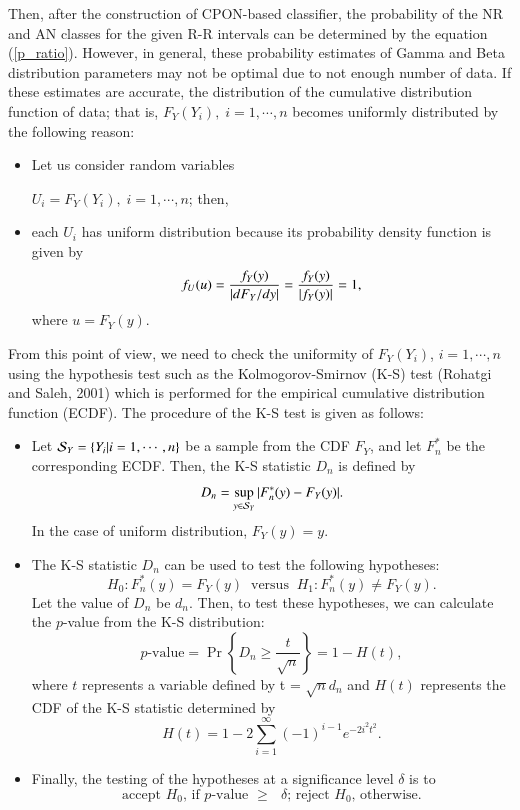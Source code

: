 \documentclass[times,twocolumn,final,authoryear]{elsarticle}
\begin{document}
Then, after the construction of CPON-based classifier, the probability of the NR and AN classes for the given R-R intervals
can be determined by the equation (\ref{p_ratio}).
However, in general, these probability estimates of Gamma and Beta distribution parameters may not be optimal
due to not enough number of data.  If these estimates are accurate, the distribution of the cumulative
distribution function of data; that is, $F_Y(Y_i), \; i=1, \cdots,
n$ becomes uniformly distributed by the following reason:
\begin{itemize}
\item Let us consider random variables 

$U_i=F_Y(Y_i), \; i=1, \cdots, n$; then,
\item each $U_i$ has uniform distribution because its probability
density function is given by
\[
f_U(u)={{f_Y(y)}\over{|{{dF_Y}/{dy}}|}}={{f_Y(y)}\over{|f_Y(y)|}}=1,
\]
where $u=F_Y(y)$.
\end{itemize}
From this point of view, we need to check the uniformity of
$F_Y(Y_i)$, $i=1, \cdots, n$ using the hypothesis test such as the
Kolmogorov-Smirnov (K-S) test (Rohatgi and Saleh, 2001) which is performed for the
empirical cumulative distribution function (ECDF). The procedure of
the K-S test is given as follows:
\begin{itemize}
\item Let ${\cal S}_Y=\{Y_i | i=1, \cdots, n\}$ be a sample from the CDF
$F_Y$, and let $F_n^*$ be the corresponding ECDF. Then, the K-S
statistic $D_n$ is defined by
\begin{equation}
D_n = \sup_{y\in {\cal S}_Y}|F_n^*(y) - F_Y(y)|. \label{D_n}
\end{equation}
In the case of uniform distribution, $F_Y(y) = y$.
\item The K-S statistic $D_n$ can be used to test the following
hypotheses:
\[
H_0: F_n^*(y)=F_Y(y) \; \; \mbox{versus} \; \; H_1: F_n^*(y)\neq
F_Y(y).
\]
Let the value of $D_n$ be $d_n$.  Then, to test these hypotheses, we
can calculate the $p$-value from the K-S distribution:
\begin{equation}
p \textrm{-value} = \Pr\left\{ D_n \geq \frac{t}{\sqrt{n}}\right\} =
1-H(t), \label{p_val}
\end{equation}
where $t$ represents a variable defined by t = $\sqrt{n}d_n$ and
$H(t)$ represents the CDF of the K-S statistic determined by
\[
H(t) = 1- 2\sum_{i=1}^\infty (-1)^{i-1}e^{-2i^2t^2}. \label{H_t}
\]
\item Finally, the testing of the hypotheses at a significance level $\delta$ is to
\[
\mbox{accept $H_0$, if $p$-value $\ge$ $\delta$; reject $H_0$,
otherwise.}\]
\end{itemize}
\end{document}
